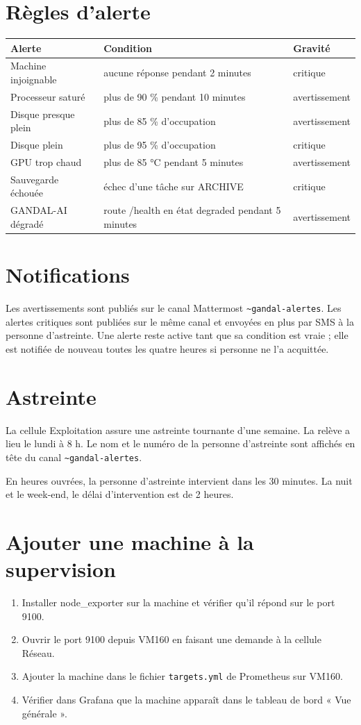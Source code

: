 \documentclass[11pt,a4paper]{report}
\begin{document}
\section{Règles d'alerte}
\begin{tabular}{|l|l|l|}
\hline
Alerte & Condition & Gravité \\
\hline
Machine injoignable & aucune réponse pendant 2 minutes & critique \\
Processeur saturé & plus de 90 \% pendant 10 minutes & avertissement \\
Disque presque plein & plus de 85 \% d'occupation & avertissement \\
Disque plein & plus de 95 \% d'occupation & critique \\
GPU trop chaud & plus de 85 °C pendant 5 minutes & avertissement \\
Sauvegarde échouée & échec d'une tâche sur ARCHIVE & critique \\
GANDAL-AI dégradé & route /health en état degraded pendant 5 minutes & avertissement \\
\hline
\end{tabular}

\section{Notifications}
Les avertissements sont publiés sur le canal Mattermost \texttt{\textasciitilde{}gandal-alertes}. Les alertes critiques sont publiées sur le même canal et envoyées en plus par SMS à la personne d'astreinte. Une alerte reste active tant que sa condition est vraie ; elle est notifiée de nouveau toutes les quatre heures si personne ne l'a acquittée.

\section{Astreinte}
La cellule Exploitation assure une astreinte tournante d'une semaine. La relève a lieu le lundi à 8 h. Le nom et le numéro de la personne d'astreinte sont affichés en tête du canal \texttt{\textasciitilde{}gandal-alertes}.

En heures ouvrées, la personne d'astreinte intervient dans les 30 minutes. La nuit et le week-end, le délai d'intervention est de 2 heures.

\section{Ajouter une machine à la supervision}
\begin{enumerate}
\item Installer node\_exporter sur la machine et vérifier qu'il répond sur le port 9100.
\item Ouvrir le port 9100 depuis VM160 en faisant une demande à la cellule Réseau.
\item Ajouter la machine dans le fichier \texttt{targets.yml} de Prometheus sur VM160.
\item Vérifier dans Grafana que la machine apparaît dans le tableau de bord « Vue générale ».
\end{enumerate}
\end{document}
